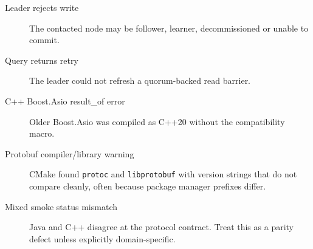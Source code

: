 \begin{description}
\item[Leader rejects write] The contacted node may be follower, learner,
decommissioned or unable to commit.
\item[Query returns retry] The leader could not refresh a quorum-backed read barrier.
\item[C++ Boost.Asio result\_of error] Older Boost.Asio was compiled as C++20
without the compatibility macro.
\item[Protobuf compiler/library warning] CMake found \texttt{protoc} and
\texttt{libprotobuf} with version strings that do not compare cleanly, often
because package manager prefixes differ.
\item[Mixed smoke status mismatch] Java and C++ disagree at the protocol
contract. Treat this as a parity defect unless explicitly domain-specific.
\end{description}
